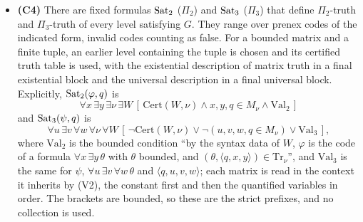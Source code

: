 \documentclass[11pt]{article}
\begin{document}
\begin{itemize}
  \begin{proof}[Self-contained proof of (C3)]
  The three conjuncts of $G$ have the forms
  $\exists x\, \theta_1$, $\forall \xi\, \exists y\, \theta_2$ and $\forall \xi\, \exists W\, \theta_3$ with bounded
  $\theta_1, \theta_2, \theta_3$ (for the third, ``$\xi$ is not an ordinal or $\mathrm{Cert}(W, \xi)$''), so $G$ is
  logically equivalent to a sentence $\forall \xi\, \forall \xi'\, \exists x\, \exists y\, \exists W\, \theta$ with
  bounded $\theta$: it is $\Pi_2$. (This prenex equivalence is the usual one for nonempty structures. The truth
  table of the empty structure $M_0$ is given separately by the clauses of (V2), with the empty assignment for
  sentences.) $G$ holds in $L_{\alpha}$ for every admissible $\alpha > \omega$, by (C2). If
  $L_{\beta} \models G$, then $\omega \in L_{\beta}$ and the ordinals of $L_{\beta}$ are closed under successor, so
  $\beta$ is a limit ordinal above $\omega$; and for every $\xi < \beta$ a certificate through $\xi$ is an element of
  $L_{\beta}$, and it is the true one by (C1).
  \end{proof}
\item \textbf{(C4)} There are fixed formulas $\mathrm{Sat}_2$ ($\Pi_2$) and $\mathrm{Sat}_3$ ($\Pi_3$) that define $\Pi_2$-truth and
  $\Pi_3$-truth of every level satisfying $G$. They range over prenex codes of the indicated form, invalid codes
  counting as false. For a bounded matrix and a finite tuple, an earlier level containing the tuple is chosen and its
  certified truth table is used, with the existential description of matrix truth in a final existential block and
  the universal description in a final universal block. Explicitly, $\mathrm{Sat}_2(\varphi, q)$ is
  \[ \forall x\, \exists y\, \exists \nu\, \exists W\, [\, \mathrm{Cert}(W, \nu) \wedge x, y, q \in M_\nu \wedge
     \mathrm{Val}_2\, ] \]
  and $\mathrm{Sat}_3(\psi, q)$ is
  \[ \forall u\, \exists v\, \forall w\, \forall \nu\, \forall W\, [\, \neg\mathrm{Cert}(W, \nu) \vee
     \neg(u, v, w, q \in M_\nu) \vee \mathrm{Val}_3\, ], \]
  where $\mathrm{Val}_2$ is the bounded condition ``by the syntax data of $W$, $\varphi$ is the code of a formula
  $\forall x\, \exists y\, \theta$ with $\theta$ bounded, and $(\theta, \langle q, x, y \rangle) \in \mathrm{Tr}_\nu$'',
  and $\mathrm{Val}_3$ is the same for $\psi$, $\forall u\, \exists v\, \forall w\, \theta$ and
  $\langle q, u, v, w \rangle$; each matrix is read in the context it inherits by (V2), the constant first and
  then the quantified variables in order. The
  brackets are bounded, so these are the strict prefixes, and no collection is used.

\end{itemize}
\end{document}
